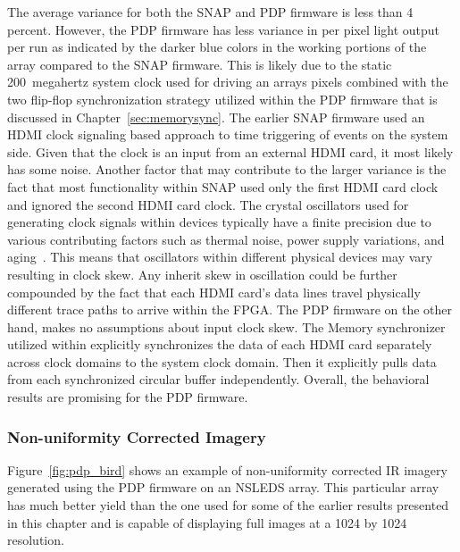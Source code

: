             The average variance for both the SNAP and PDP firmware is less than 4 percent. However, the PDP firmware has less variance in per pixel light output per run as indicated by the darker blue colors in the working portions of the array compared to the SNAP firmware. This is likely due to the static \mbox{200 megahertz} system clock used for driving an arrays pixels combined with the two flip-flop synchronization strategy utilized within the PDP firmware that is discussed in Chapter~\ref{sec:memorysync}. The earlier SNAP firmware used an HDMI clock signaling based approach to time triggering of events on the system side. Given that the clock is an input from an external HDMI card, it most likely has some noise. Another factor that may contribute to the larger variance is the fact that most functionality within SNAP used only the first HDMI card clock and ignored the second HDMI card clock. The crystal oscillators used for generating clock signals within devices typically have a finite precision due to various contributing factors such as thermal noise, power supply variations, and aging~\cite{Naval2002}. This means that oscillators within different physical devices may vary resulting in clock skew. Any inherit skew in oscillation could be further compounded by the fact that each HDMI card's data lines travel physically different trace paths to arrive within the FPGA. The PDP firmware on the other hand, makes no assumptions about input clock skew. The Memory synchronizer utilized within explicitly synchronizes the data of each HDMI card separately across clock domains to the system clock domain. Then it explicitly pulls data from each synchronized circular buffer independently. Overall, the behavioral results are promising for the PDP firmware.

        \subsubsection{Non-uniformity Corrected Imagery}
            Figure~\ref{fig:pdp_bird} shows an example of non-uniformity corrected IR imagery generated using the PDP firmware on an NSLEDS array. This particular array has much better yield than the one used for some of the earlier results presented in this chapter and is capable of displaying full images at a 1024 by 1024 resolution.

